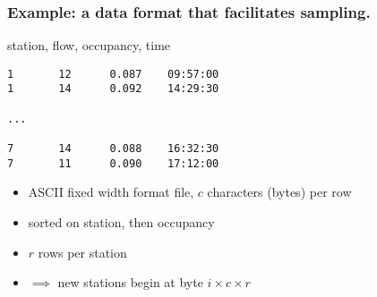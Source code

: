 \documentclass{beamer}
\begin{document}
\begin{frame}[fragile]

    \frametitle{Example: a data format that facilitates sampling.}


station, flow, occupancy, time
\begin{verbatim}
1       12      0.087    09:57:00
1       14      0.092    14:29:30

...

7       14      0.088    16:32:30
7       11      0.090    17:12:00
\end{verbatim}

    \begin{itemize}

        \item ASCII fixed width format file, $c$ characters (bytes) per row
        \item sorted on station, then occupancy
        \item $r$ rows per station
        \item $\implies$ new stations begin at byte $i \times c \times r$

    \end{itemize}


\end{frame}
\end{document}

